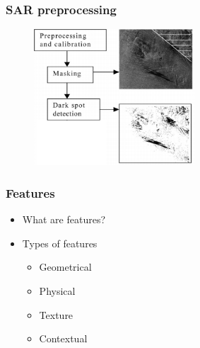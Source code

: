 \documentclass{beamer}
\begin{document}
\begin{frame}
\frametitle{SAR preprocessing}

	\begin{figure}
		\centering
    	\includegraphics[width=60mm,scale=1]{./img/preprocessing_diagram.png}
	\end{figure}
	
\end{frame}


\begin{frame}
\frametitle{Features}

	\begin{itemize}
		\item What are features?
		\item Types of features 
			\begin{itemize}
				\item Geometrical 
				\item Physical 
				\item Texture 
				\item Contextual  
			\end{itemize}	
	\end{itemize}

\end{frame}

\end{document}
